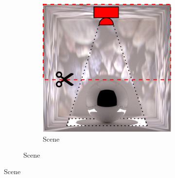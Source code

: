 \begin{figure}[]
    \centering    
    \begin{subfigure}{\textwidth}
        \centering
        \begin{subfigure}{0.5\textwidth}
            \centering
            \includegraphics[width=\textwidth]{images/04-experiment03/ball_dof/scene_highlighted.jpg}
            \caption{Scene}
            \label{fig:ex03-ball_dof-scene}
        \end{subfigure}


\end{subfigure}
\end{figure}
